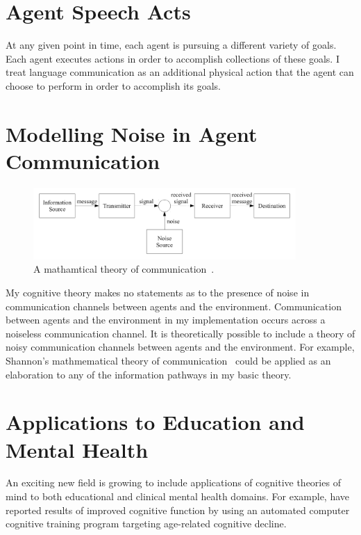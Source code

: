 \section{Agent Speech Acts}

At any given point in time, each agent is pursuing a different variety
of goals.  Each agent executes actions in order to accomplish
collections of these goals.  I treat language communication as an
additional physical action that the agent can choose to perform in
order to accomplish its goals.

\section{Modelling Noise in Agent Communication}

\begin{figure}[bth]
  \center
  \includegraphics[width=10cm]{gfx/communication_theory}
  \caption[A mathematical theory of communication]{A mathamtical
    theory of communication~\citep{shannon:1959}.}
  \label{fig:communication_theory}
\end{figure}

My cognitive theory makes no statements as to the presence of noise
in communication channels between agents and the environment.
Communication between agents and the environment in my implementation
occurs across a noiseless communication channel.  It is theoretically
possible to include a theory of noisy communication channels between
agents and the environment.  For example, Shannon's mathmematical
theory of communication~\citep{shannon:1959} could be applied as an
elaboration to any of the information pathways in my basic theory.


%
%

\section{Applications to Education and Mental Health}

An exciting new field is growing to include applications of cognitive
theories of mind to both educational and clinical mental health
domains.  For example, \cite{mahncke:2006} have reported results of
improved cognitive function by using an automated computer cognitive
training program targeting age-related cognitive decline.



